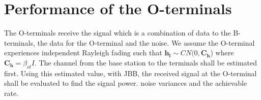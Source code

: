 \documentclass[10pt, a4paper, twoside,fleqn]{article}
\begin{document}

\section{Performance of the O-terminals}
	The O-terminals receive the signal which is a combination of data to the B-terminals, the data for the O-terminal and the noise. We assume the O-terminal experiences independent Rayleigh fading such that $\pmb{h_{l}} \sim CN(0,\pmb{C_h}$) where $\pmb{C_h} = \beta_{ol}I$. The channel from the base station to the terminals shall be estimated first. Using this estimated value, with JBB, the received signal at the O-terminal shall be evaluated to find the signal power. noise variances and the achievable rate.
\end{document}
